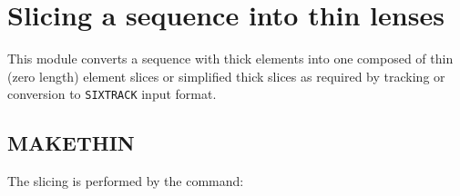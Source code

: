  
\chapter{Slicing a sequence into thin lenses}
\label{chap:makethin}

This module converts a sequence with thick elements into one composed of
thin (zero length) element slices or simplified thick slices as required
by \madx tracking or conversion to \texttt{SIXTRACK} input format.

\section{MAKETHIN}
\label{sec:makethin}

The slicing is performed by the command: 

